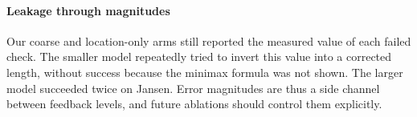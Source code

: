 \paragraph{Leakage through magnitudes} Our coarse and location-only arms still reported the measured value of each failed check. The smaller model repeatedly tried to invert this value into a corrected length, without success because the minimax formula was not shown. The larger model succeeded twice on Jansen. Error magnitudes are thus a side channel between feedback levels, and future ablations should control them explicitly.
